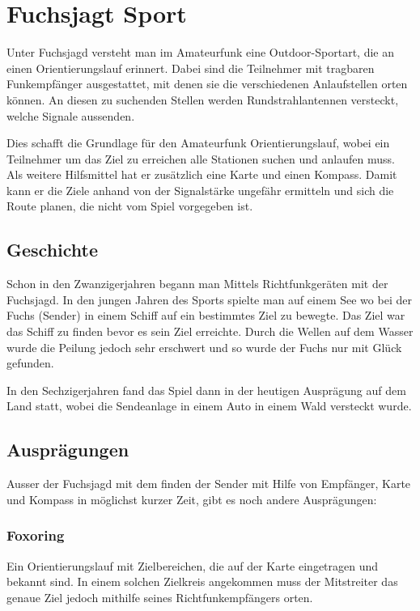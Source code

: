 \newpage
\section{Fuchsjagt Sport} %
\label{sec:Fuchsjagt Sport}

Unter Fuchsjagd versteht man im Amateurfunk eine Outdoor-Sportart, die an einen Orientierungslauf erinnert. Dabei sind die Teilnehmer mit tragbaren Funkempfänger ausgestattet, mit denen sie die verschiedenen Anlaufstellen orten können. An diesen zu suchenden Stellen werden Rundstrahlantennen versteckt, welche Signale aussenden.

Dies schafft die Grundlage für den Amateurfunk Orientierungslauf, wobei ein Teilnehmer um das Ziel zu erreichen alle Stationen suchen und anlaufen muss. Als weitere Hilfsmittel hat er zusätzlich eine Karte und einen Kompass. Damit kann er die Ziele anhand von der Signalstärke ungefähr ermitteln und sich die Route planen, die nicht vom Spiel vorgegeben ist. 

\subsection{Geschichte} %
\label{sub:Geschichte}

Schon in den Zwanzigerjahren begann man Mittels Richtfunkgeräten mit der Fuchsjagd. In den jungen Jahren des Sports spielte man auf einem See wo bei der Fuchs (Sender) in einem Schiff auf ein bestimmtes Ziel zu bewegte. Das Ziel war das Schiff zu finden bevor es sein Ziel erreichte. Durch die Wellen auf dem Wasser wurde die Peilung jedoch sehr erschwert und so wurde der Fuchs nur mit Glück gefunden.

In den Sechzigerjahren fand das Spiel dann in der heutigen Ausprägung auf dem Land statt, wobei die Sendeanlage in einem Auto in einem Wald versteckt wurde. 

\subsection{Ausprägungen} %
\label{sub:Ausprägungen}

Ausser der Fuchsjagd mit dem finden der Sender mit Hilfe von Empfänger, Karte und Kompass in möglichst kurzer Zeit, gibt es noch andere Ausprägungen:

\subsubsection{Foxoring} %
\label{ssub:Foxoring}
Ein Orientierungslauf mit Zielbereichen, die auf der Karte eingetragen und bekannt sind. In einem solchen Zielkreis angekommen muss der Mitstreiter das genaue Ziel jedoch mithilfe seines Richtfunkempfängers orten.

